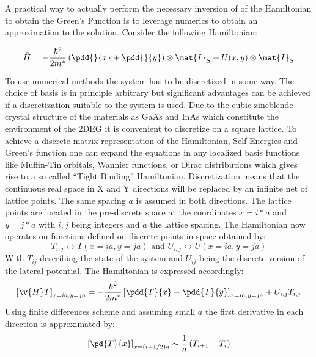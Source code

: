 A practical way to actually perform the necessary inversion of of the Hamiltonian to obtain the Green's Function is to leverage numerics to obtain an approximation to the solution.
Consider the following Hamiltonian:

\begin{equation}
	\hat{H} = -\frac{\hbar^{2}}{2m^*}\left(\pdd{}{x}+\pdd{}{y}\right) \otimes \mat{I}_S + U(x,y) \otimes \mat{I}_S
  \label{eqn:effectivemasshamiltonian}
\end{equation}

To use numerical methods the system has to be discretized in some way. The choice of basis is in principle arbitrary but significant advantages can be achieved if a discretization suitable to the system is used.
Due to the cubic zincblende crystal structure of the materials as GaAs and InAs which constitute the environment of the 2DEG it is convenient to discretize on a square lattice.
To achieve a discrete matrix-representation of the Hamiltonian, Self-Energies and Green's function one can expand the equations in any localized basis functions like Muffin-Tin orbitals, Wannier functions, or Dirac distributions which gives rise to a so called ``Tight Binding'' Hamiltonian. Discretization means that the continuous real space in X and Y directions will be replaced by an infinite net of lattice points. The same spacing $a$ is assumed in both directions. The lattice points are located in the pre-discrete space at the coordinates $x=i*a$ and $y=j*a$ with $i,j$ being integers and $a$ the lattice spacing. The Hamiltonian now operates on functions defined on discrete points in space obtained by:
\begin{equation}
  T_{i,j} \leftrightarrow T(x=ia,y=ja) \mbox{ and } U_{i,j}\leftrightarrow U(x=ia,y=ja)
  \label{FunctionDescrete}
\end{equation}
With $T_{ij}$ describing the state of the system and $U_{ij}$ being the discrete version of the lateral potential.
The Hamiltonian is expressed accordingly:
\begin{equation}
  \left[\v{H}T\right]_{x=ia,y=ja}=-\frac{\hbar^{2}}{2m^*}\left[\pdd{T}{x}+\pdd{T}{y}\right]_{x=ia,y=ja}+U_{i,j}T_{i,j}
  \label{DiscreteHamiltonian}
\end{equation}
Using finite differences scheme and assuming small $a$ the first derivative in each direction is approximated by:
\begin{equation}
  \left[\pd{T}{x}\right]_{x=(i+1/2)a} \sim  \frac{1}{a}\left(T_{i+1}-T_{i}\right)
  \label{ApproximateFirstDerivative}
\end{equation}
